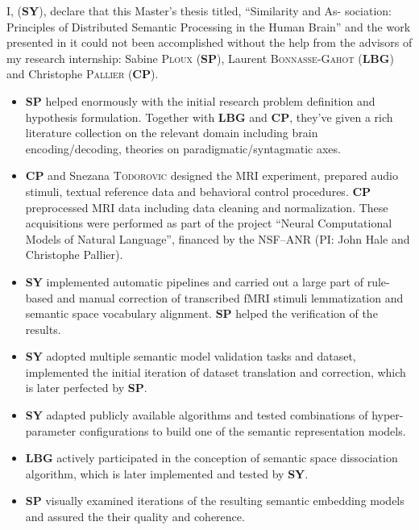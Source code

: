 \begin{declarationcontribution}
    \addchaptertocentry{\contributionname} %
    \noindent I, \authorname (\textbf{SY}), declare that this Master's thesis titled, \enquote{Similarity and As- sociation: Principles of Distributed Semantic Processing in the Human Brain} and the work presented in it could not been accomplished without the help from the advisors of my research internship: Sabine \textsc{Ploux} (\textbf{SP}), Laurent \textsc{Bonnasse-Gahot} (\textbf{LBG}) and Christophe \textsc{Pallier} (\textbf{CP}).
    
    \begin{itemize} 
    \item \textbf{SP} helped enormously with the initial research problem definition and hypothesis formulation. Together with \textbf{LBG} and \textbf{CP}, they've given a rich literature collection on the relevant domain including brain encoding/decoding, theories on paradigmatic/syntagmatic axes.
    \item \textbf{CP} and Snezana \textsc{Todorovic} designed the MRI experiment, prepared audio stimuli, textual reference data and behavioral control procedures. \textbf{CP} preprocessed MRI data including data cleaning and normalization. These acquisitions were performed as part of the project ``Neural Computational Models of Natural Language'', financed by the NSF--ANR (PI: John Hale and Christophe Pallier).
    \item \textbf{SY} implemented automatic pipelines and carried out a large part of rule-based and manual correction of transcribed fMRI stimuli lemmatization and semantic space vocabulary alignment. \textbf{SP} helped the verification of the results.
    \item \textbf{SY} adopted multiple semantic model validation tasks and dataset, implemented the initial iteration of dataset translation and correction, which is later perfected by \textbf{SP}.
    \item \textbf{SY} adapted publicly available algorithms and tested combinations of hyper-parameter configurations to build one of the semantic representation models.
    \item \textbf{LBG} actively participated in the conception of semantic space dissociation algorithm, which is later implemented and tested by \textbf{SY}. 
    \item \textbf{SP} visually examined iterations of the resulting semantic embedding models and assured the their quality and coherence.

\end{itemize}
\end{declarationcontribution}
